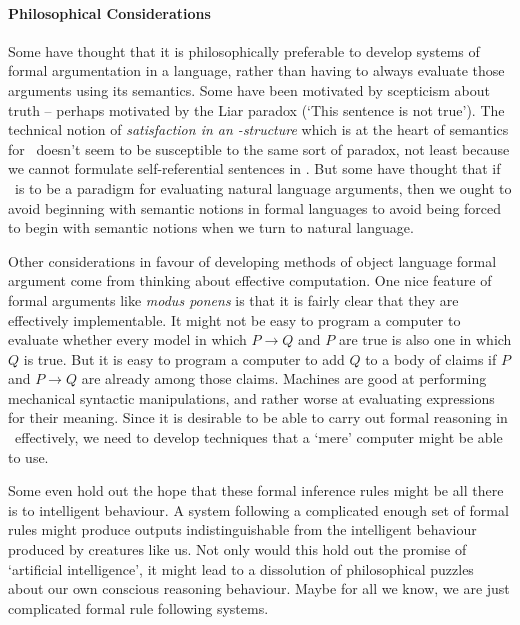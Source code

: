 \paragraph{Philosophical Considerations} Some have thought that it is philosophically preferable to develop systems of formal argumentation in a language, rather than having to always evaluate those arguments using its semantics. Some have been motivated by scepticism about truth – perhaps motivated by the Liar paradox (`This sentence is not true'). The technical notion of \emph{satisfaction in an \lone-structure} which is at the heart of semantics for \lone\ doesn't seem to be susceptible to the same sort of paradox, not least because we cannot formulate self-referential sentences in \lone. But some have thought that if \lone\ is to be a paradigm for evaluating natural language arguments, then we ought to avoid beginning with semantic notions in formal languages to avoid being forced to begin with semantic notions when we turn to natural language. 

Other considerations in favour of developing methods of object language formal argument come from thinking about effective computation. One nice feature of formal arguments like \emph{modus ponens} is that it is fairly clear that they are effectively implementable. It might not be easy to program a computer to evaluate whether every model in which $P\to Q$ and $P$ are true is also one in which $Q$ is true. But it is easy to program a computer to add $Q$ to a body of claims if $P$ and $P \to Q$ are already among those claims. Machines are good at performing mechanical syntactic manipulations, and rather worse at evaluating expressions for their meaning. Since it is desirable to be able to carry out formal reasoning in \lone\ effectively, we need to develop techniques that a `mere' computer might be able to use.

Some even hold out the hope that these formal inference rules might be all there is to intelligent behaviour. A system following a complicated enough set of formal rules might produce outputs indistinguishable from the intelligent behaviour produced by creatures like us. Not only would this hold out the promise of `artificial intelligence', it might lead to a dissolution of philosophical puzzles about our own conscious reasoning behaviour. Maybe for all we know, we are just complicated formal rule following systems.

